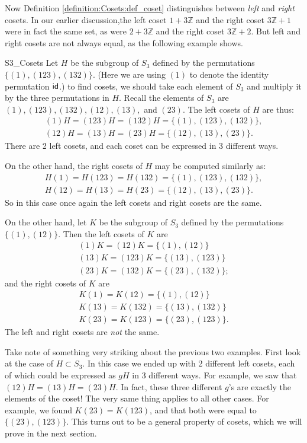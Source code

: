 Now Definition \ref{definition:Cosets:def_coset} distinguishes between  \emph{left} and \emph{right} cosets.   In our earlier discussion,the left coset $1 + 3{\mathbb Z}$ and the right coset $ 3{\mathbb Z} + 1$ were in fact the same set, as were $2 + 3{\mathbb Z}$ and the right coset $ 3{\mathbb Z} + 2$.  But left and right cosets are not always equal, as the following example shows.  

\begin{example}{S3_Cosets}
Let $H$ be the subgroup of $S_3$ defined by the permutations $\{(1), (123), (132) \}$.  (Here we are using $(1)$ to denote the identity permutation ${\sf{i}d}$.) to find  cosets, we should take each element of $S_3$ and multiply it by the three permutations in $H$.  Recall the elements of $S_3$ are $(1), (123), (132), (12), (13),$ and $(23)$.  The left cosets of $H$ are thus: 
\begin{gather*}
(1)H = (1 2 3)H =  (132)H = \{(1), (1 23), (132) \}, \\
(1 2)H = (1 3)H = (2 3)H =  \{ (1 2), (1 3), (2 3)  \}.
\end{gather*}
There are 2 left cosets, and each coset can be expressed in 3 different ways. 

On the other hand, the right cosets of $H$ may be computed similarly as:
\begin{gather*}
H(1) = H(1 2 3) =  H(132) = \{(1), (1 23), (132) \}, \\
H(1 2) = H(1 3) = H(2 3) =  \{ (1 2), (1 3), (2 3)  \}.
\end{gather*}
So in this case once again the left cosets and right cosets are the same.

On the other hand, let $K$ be the subgroup of $S_3$ defined by the permutations $\{(1), (1 2)\}$.  Then the left cosets of $K$ are
\begin{gather*}
(1)K = (1 2)K = \{(1), (1 2)\} \\
(1 3)K = (1 2 3)K = \{(1 3), (1 2 3)\} \\
(2 3)K = (1 3 2)K = \{(2 3), (1 3 2)\};
\end{gather*}
and the right cosets of $K$ are
\begin{gather*}
K(1) = K(1 2) = \{(1), (1 2)\} \\
K(1 3) = K(1 3 2) = \{(1 3), (1 3 2)\} \\
K(2 3) = K(1 2 3) = \{(2 3), (1 2 3)\}.
\end{gather*}
The left and right cosets are \emph{not} the same. 

Take note of something very striking about the previous two examples. First look at the case of $H \subset S_3$. In this case we ended up with 2 different left cosets, each of which could be expressed as $gH$ in 3 different ways.  For example, we saw that  $(1 2)H = (1 3)H = (2 3)H$. In fact, these three different $g$'s are exactly the elements of the coset! The very same thing applies to all other cases. For example, we found  $K(2 3) = K(1 2 3)$, and that both were equal to  $ \{(2 3), (1 2 3)\}$. This turns out to be a general property of cosets, which we will prove in the next section.
\end{example}


